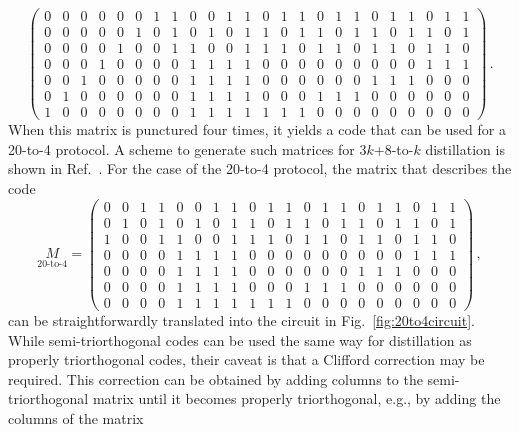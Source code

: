 \documentclass[prx,aps,letterpaper,twocolumn,allowfontchageintitle=true,accepted=2019-02-01]{quantumarticle}
\begin{document}
\begin{equation}
\begin{pmatrix}
 0 & 0 & 0 & 0 & 0 & 0 & 1 & 1 & 0 & 0 & 1 & 1 & 0 & 1 & 1 & 0 & 1 & 1 & 0 & 1 & 1 & 0 & 1 & 1 \\
 0 & 0 & 0 & 0 & 0 & 1 & 0 & 1 & 0 & 1 & 0 & 1 & 1 & 0 & 1 & 1 & 0 & 1 & 1 & 0 & 1 & 1 & 0 & 1 \\
 0 & 0 & 0 & 0 & 1 & 0 & 0 & 1 & 1 & 0 & 0 & 1 & 1 & 1 & 0 & 1 & 1 & 0 & 1 & 1 & 0 & 1 & 1 & 0 \\
 0 & 0 & 0 & 1 & 0 & 0 & 0 & 0 & 1 & 1 & 1 & 1 & 0 & 0 & 0 & 0 & 0 & 0 & 0 & 0 & 0 & 1 & 1 & 1 \\
 0 & 0 & 1 & 0 & 0 & 0 & 0 & 0 & 1 & 1 & 1 & 1 & 0 & 0 & 0 & 0 & 0 & 0 & 1 & 1 & 1 & 0 & 0 & 0 \\
 0 & 1 & 0 & 0 & 0 & 0 & 0 & 0 & 1 & 1 & 1 & 1 & 0 & 0 & 0 & 1 & 1 & 1 & 0 & 0 & 0 & 0 & 0 & 0 \\
 1 & 0 & 0 & 0 & 0 & 0 & 0 & 0 & 1 & 1 & 1 & 1 & 1 & 1 & 1 & 0 & 0 & 0 & 0 & 0 & 0 & 0 & 0 & 0 
\end{pmatrix} \, .
\end{equation}
When this matrix is punctured four times, it yields a code that can be used for a 20-to-4 protocol. A scheme to generate such matrices for $3k$+8-to-$k$ distillation is shown in Ref.~\cite{Bravyi2012}. For the case of the 20-to-4 protocol, the matrix that describes the code
\begin{equation}
\underset{\text{20-to-4}}{M} = 
\begin{pmatrix}
 0 & 0 & 1 & 1 & 0 & 0 & 1 & 1 & 0 & 1 & 1 & 0 & 1 & 1 & 0 & 1 & 1 & 0 & 1 & 1 \\
 0 & 1 & 0 & 1 & 0 & 1 & 0 & 1 & 1 & 0 & 1 & 1 & 0 & 1 & 1 & 0 & 1 & 1 & 0 & 1 \\
 1 & 0 & 0 & 1 & 1 & 0 & 0 & 1 & 1 & 1 & 0 & 1 & 1 & 0 & 1 & 1 & 0 & 1 & 1 & 0 \\
 \hline
 0 & 0 & 0 & 0 & 1 & 1 & 1 & 1 & 0 & 0 & 0 & 0 & 0 & 0 & 0 & 0 & 0 & 1 & 1 & 1 \\
 0 & 0 & 0 & 0 & 1 & 1 & 1 & 1 & 0 & 0 & 0 & 0 & 0 & 0 & 1 & 1 & 1 & 0 & 0 & 0 \\
 0 & 0 & 0 & 0 & 1 & 1 & 1 & 1 & 0 & 0 & 0 & 1 & 1 & 1 & 0 & 0 & 0 & 0 & 0 & 0 \\
 0 & 0 & 0 & 0 & 1 & 1 & 1 & 1 & 1 & 1 & 1 & 0 & 0 & 0 & 0 & 0 & 0 & 0 & 0 & 0 
\end{pmatrix} \, ,
\label{eqn:semitriorth1}
\end{equation}
can be straightforwardly translated into the circuit in Fig.~\ref{fig:20to4circuit}. While semi-triorthogonal codes can be used the same way for distillation as properly triorthogonal codes, their caveat is that a Clifford correction may be required. This correction can be obtained by adding columns to the semi-triorthogonal matrix until it becomes properly triorthogonal, e.g., by adding the columns of the matrix
\end{document}
